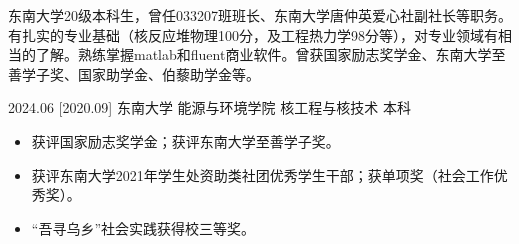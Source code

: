 \documentclass[zh]{resume}
\begin{document}
\makeheader

{\onehalfspacing\hspace{2em}%
东南大学20级本科生，曾任033207班班长、东南大学唐仲英爱心社副社长等职务。有扎实的专业基础（核反应堆物理100分，及工程热力学98分等），对专业领域有相当的了解。熟练掌握matlab和fluent商业软件。曾获国家励志奖学金、东南大学至善学子奖、国家助学金、伯藜助学金等。
\par}
\begin{educations}
  \education%
    {2024.06}%
    [2020.09]%
    {东南大学}%
    {能源与环境学院}%
    {核工程与核技术}%
    {本科}
\end{educations}
\begin{competences}
 

\end{competences}

\begin{itemize}
\item{获评国家励志奖学金；获评东南大学至善学子奖。}
\item{获评东南大学2021年学生处资助类社团优秀学生干部；获单项奖（社会工作优秀奖）。}
\item{“吾寻乌乡”社会实践获得校三等奖。}
\end{itemize}
\end{document}
